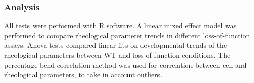 

\subsubsection{Analysis}
All tests were performed with R software.
A linear mixed effect model was performed to compare rheological parameter trends in different loss-of-function assays.
Anova tests compared linear fits on developmental trends of the rheological parameters between WT and loss of function conditions.
The percentage bend correlation method was used for correlation between cell and rheological parameters, to take in account outliers.
